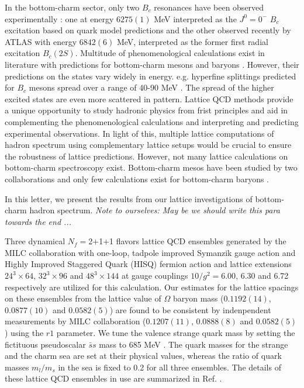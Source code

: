 \documentclass[showkeys,aps,10pt,twocolumn,showpacs,preprintnumbers,amsmath,amssymb,prd,letterpaper,floatfix,nofootinbib,superscriptaddress,]{revtex4-1}
\newcommand\self[1]{{\color{blue}\it Note to ourselves: #1}}
\begin{document}
In the bottom-charm sector, only two $B_c$ resonances have been observed experimentally : one at energy 
$6275(1)$ MeV interpreted as the $J^0=0^-$ $B_c$ excitation based on quark model predictions and the 
other observed recently by ATLAS with energy $6842(6)$ MeV, interpreted as the former first radial 
excitation $B_c(2S)$. Multitude of phenomenological calculations exist in literature with predictions 
for bottom-charm mesons \cite{} and baryons \cite{}. However, their predictions on the states vary widely 
in energy. e.g. hyperfine splittings predicted for $B_c$ mesons spread over a range of 40-90 MeV \cite{}. 
The spread of the higher excited states are even more scattered in pattern. Lattice QCD methods provide 
a unique opportunity to study hadronic physics from frist principles and aid in complementing the 
phenomenological calculations and interpreting and predicting experimental observations. In light of this, 
multiple lattice computations of hadron spectrum using complementary lattice setups would be crucial to 
ensure the robustness of lattice predictions. However, not many lattice calculations on bottom-charm 
spectroscopy exist. Bottom-charm mesos have been studied by two collaborations \cite{} and only few 
calculations exist for bottom-charm baryons \cite{}. 

In this letter, we present the results from our lattice investigations of bottom-charm hadron spectrum. 
\self{May be we should write this para towards the end ...}

Three dynamical $N_f = $2+1+1 flavors lattice QCD ensembles generated by the MILC collaboration with 
one-loop, tadpole improved Symanzik gauge action and Highly Improved Staggered Quark (HISQ) fermion 
action \cite{} and lattice extensions $24^3\times64$, $32^3\times96$ and $48^3\times144$ at gauge 
couplings $10/g^2 = 6.00$, 6.30 and 6.72 respectively are utilized for this calculation. Our estimates 
for the lattice spacings on these ensembles from the lattice value of $\Omega$ baryon mass ($0.1192(14)$, 
$0.0877(10)$ and $0.0582(5)$) are found to be consistent by indenpendent measurements by MILC 
collaboration ($0.1207(11)$, $0.0888(8)$ and $0.0582(5)$) using the $r1$ parameter. We tune the valence 
strange quark mass by setting the fictituous pseudoscalar $\bar ss$ mass to 685 MeV \cite{}. The quark 
masses for the strange and the charm sea are set at their physical values, whereas the ratio of quark 
masses $m_l/m_s$ in the sea is fixed to 0.2 for all three ensembles. The details of these lattice QCD 
ensembles in use are summarized in Ref. \cite{}.  
\end{document}

